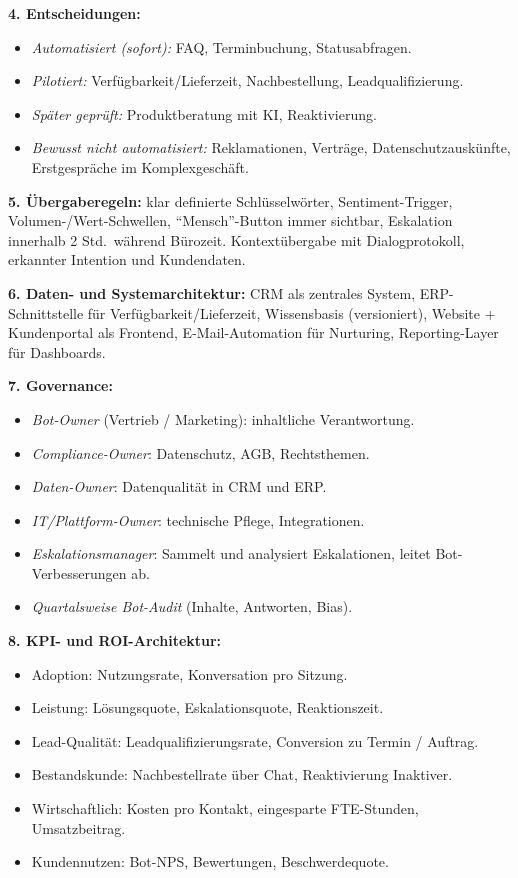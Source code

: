 \documentclass[11pt,a4paper,oneside]{article}
\begin{document}
\begin{loesungbox}
\smallskip
\textbf{4. Entscheidungen:}
\begin{itemize}
  \item \emph{Automatisiert (sofort):} FAQ, Terminbuchung, Statusabfragen.
  \item \emph{Pilotiert:} Verfügbarkeit/Lieferzeit, Nachbestellung, Leadqualifizierung.
  \item \emph{Später geprüft:} Produktberatung mit KI, Reaktivierung.
  \item \emph{Bewusst nicht automatisiert:} Reklamationen, Verträge, Datenschutzauskünfte, Erstgespräche im Komplexgeschäft.
\end{itemize}

\textbf{5. Übergaberegeln:} klar definierte Schlüsselwörter, Sentiment-Trigger, Volumen-/Wert-Schwellen, ``Mensch''-Button immer sichtbar, Eskalation innerhalb 2 Std.\ während Bürozeit. Kontextübergabe mit Dialogprotokoll, erkannter Intention und Kundendaten.

\smallskip
\textbf{6. Daten- und Systemarchitektur:} CRM als zentrales System, ERP-Schnittstelle für Verfügbarkeit/Lieferzeit, Wissensbasis (versioniert), Website + Kundenportal als Frontend, E-Mail-Automation für Nurturing, Reporting-Layer für Dashboards.

\smallskip
\textbf{7. Governance:}
\begin{itemize}
  \item \emph{Bot-Owner} (Vertrieb / Marketing): inhaltliche Verantwortung.
  \item \emph{Compliance-Owner}: Datenschutz, AGB, Rechtsthemen.
  \item \emph{Daten-Owner}: Datenqualität in CRM und ERP.
  \item \emph{IT/Plattform-Owner}: technische Pflege, Integrationen.
  \item \emph{Eskalationsmanager}: Sammelt und analysiert Eskalationen, leitet Bot-Verbesserungen ab.
  \item \emph{Quartalsweise Bot-Audit} (Inhalte, Antworten, Bias).
\end{itemize}

\textbf{8. KPI- und ROI-Architektur:}
\begin{itemize}
  \item Adoption: Nutzungsrate, Konversation pro Sitzung.
  \item Leistung: Lösungsquote, Eskalationsquote, Reaktionszeit.
  \item Lead-Qualität: Leadqualifizierungsrate, Conversion zu Termin / Auftrag.
  \item Bestandskunde: Nachbestellrate über Chat, Reaktivierung Inaktiver.
  \item Wirtschaftlich: Kosten pro Kontakt, eingesparte FTE-Stunden, Umsatzbeitrag.
  \item Kundennutzen: Bot-NPS, Bewertungen, Beschwerdequote.
\end{itemize}


\end{loesungbox}
\end{document}
